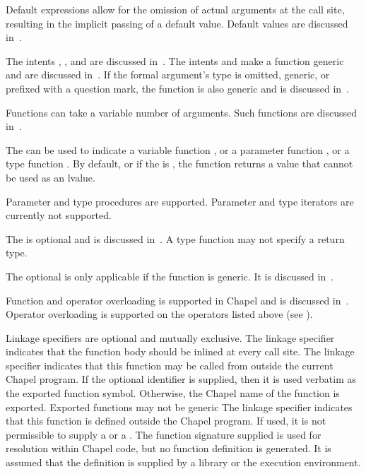 Default expressions allow for the omission of actual arguments at the
call site, resulting in the implicit passing of a default value.
Default values are discussed in~.

The intents , , and  are discussed
in~.  The intents  and  make
a function generic and are discussed in~.  If the
formal argument's type is omitted, generic, or prefixed with a question
mark, the function is also generic and is discussed
in~.

Functions can take a variable number of arguments.  Such functions are
discussed in~.

The  can be used to indicate
a variable function ,
or a parameter function ,
or a type function .
By default, or if the  is ,
the function returns a value that cannot be used as an lvalue.

\begin{openissue}
Parameter and type procedures are supported. Parameter and type
iterators are currently not supported.
\end{openissue}

The  is optional and is discussed in~.
A type function may not specify a return type.

The optional  is only applicable if the function is
generic.  It is discussed in~.

Function and operator overloading is supported in Chapel and is
discussed in~.
Operator overloading is supported on the operators listed
above (see ).

Linkage specifiers are optional and mutually exclusive.
The linkage specifier  indicates that the function body should be
inlined at every call site.  
The linkage specifier  indicates that this function may be called
from outside the current Chapel program.  If the optional identifier is
supplied, then it is used verbatim as the exported function symbol.  Otherwise,
the Chapel name of the function is exported.  Exported functions may not be generic
The linkage specifier  indicates that this function is defined
outside the Chapel program.  If used, it is not permissible to supply
a  or a .  The function signature
supplied is used for resolution within Chapel code, but no function definition
is generated.  It is assumed that the definition is supplied by a library or the
execution environment.

